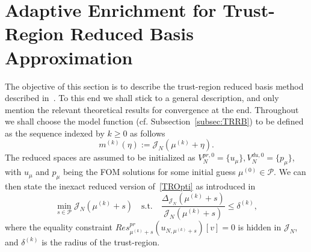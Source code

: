 \section{Adaptive Enrichment for Trust-Region Reduced Basis Approximation}

The objective of this section is to describe the trust-region reduced basis method described in~\cite[Section 4]{Keil2021}.
To this end we shall stick to a general description, and only mention the relevant theoretical results for convergence at the end.
Throughout we shall choose the model function (cf. Subsection~\ref{subsec:TRRB}) to be defined as the sequence indexed by $k \geq 0$ as follows
\begin{equation*}\label{TRModelFunc}
    m^{(k)}(\eta) := \mathcal{J}_N(\mu^{(k)} + \eta).
\end{equation*}
The reduced spaces are assumed to be initialized as $V_N^{pr, 0} = \{ u_\mu \}, V_N^{du, 0} = \{ p_\mu \}$, with $u_\mu$ and $p_\mu$ being the FOM solutions for some initial guess $\mu^{(0)} \in \mathcal{P}$.
We can then state the inexact reduced version of~\eqref{TROpti} as introduced in~\cite[Equation 51]{Qian2017}
\begin{equation}\label{TRInexactOpti}
    \min\limits_{s \in \mathcal{P}} \mathcal{J}_N(\mu^{(k)} + s) \quad \text{s.t.} \quad \frac{\Delta_{\mathcal{J}_N}(\mu^{(k)} + s)}{\mathcal{J}_N(\mu^{(k)} + s)} \leq \delta^{(k)},
\end{equation}
where the equality constraint $Res_{\mu^{(k)} + s}^{pr} (u_{N, \mu^{(k)} + s})[v] = 0$ is hidden in $\mathcal{J}_N$, and $\delta^{(k)}$ is the radius of the trust-region.


